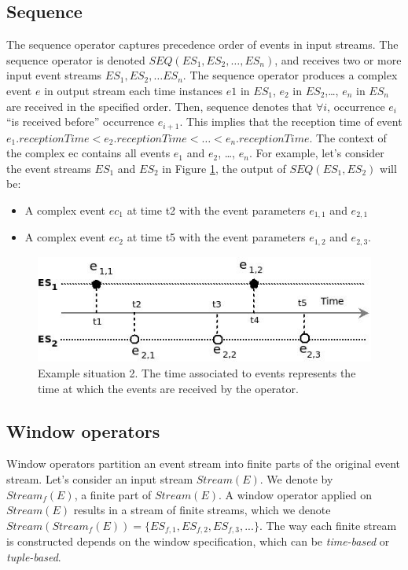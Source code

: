  \subsection{Sequence}
 The sequence operator captures precedence order of events in input streams. The sequence operator is denoted $SEQ(ES_1, ES_2, …, ES_n)$, and receives two or more input event streams $ES_1, ES_2, … ES_n$. The sequence operator produces a complex event $e$ in output stream each time instances $e1$ in $ES_1$, $e_2$ in $ES_2$,…, $e_n$ in $ES_n$ are received in the specified order. 
 Then, sequence denotes that $\forall i$, occurrence $e_i$ “is received before” occurrence $e_{i+1}$. 
 This implies that the reception time of event $e_1.receptionTime < e_2.receptionTime < …< e_n.receptionTime$.
 The context of the complex ec contains all events $e_1$ and $e_2$, …, $e_n$. 
 For example, let's consider the event streams $ES_1$ and $ES_2$ in Figure \ref{fig:op_seq_exple}, the output of $SEQ(ES_1, ES_2)$ will be:
 \begin{itemize}
  \item A complex event $ec_1$ at time t2 with the event parameters $e_{1,1}$ and $e_{2,1}$
  \item A complex event $ec_2$ at time t5 with the event parameters $e_{1,2}$ and $e_{2,3}$.
 \end{itemize}
 \begin{figure}[h]
  \begin{center}
    \includegraphics[scale=0.65]{chap3/images/seqExample.jpeg}
  \end{center}
  \caption{Example situation 2. The time associated to events represents the time at which the events are received by the operator.}
  \label{fig:op_seq_exple}
\end{figure}
 \subsection{Window operators}
 Window operators partition an event stream into finite parts of the original event stream. Let's consider an input stream $Stream(E)$. We denote by $Stream_f(E)$, a finite part of $Stream(E)$. A window operator applied on $Stream(E)$ results in a stream of finite streams, which we denote $Stream(Stream_f(E))= \{ES_{f,1}, ES_{f,2}, ES_{f,3}, ...\}$.
 The way each finite stream is constructed depends on the window specification, which can be \textit{time-based} or \textit{tuple-based}.
